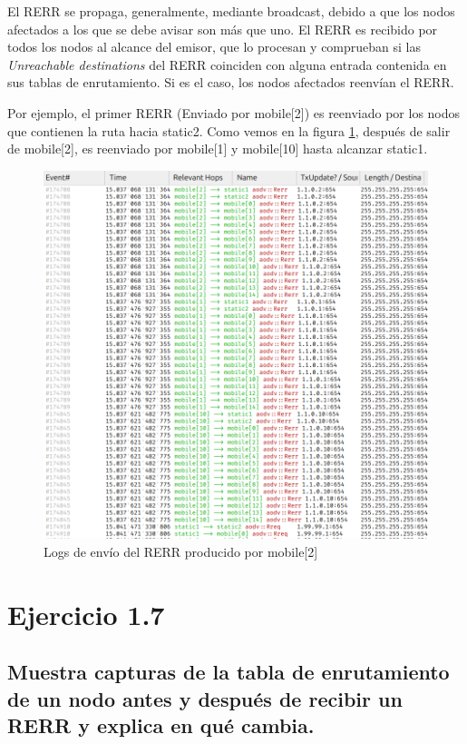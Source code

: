 El RERR se propaga, generalmente, mediante broadcast, debido a que los nodos afectados a los que se debe avisar son más que uno. El RERR es recibido por todos los nodos al alcance del emisor, que lo procesan y comprueban si las \textit{Unreachable destinations} del RERR coinciden con alguna entrada contenida en sus tablas de enrutamiento. Si es el caso, los nodos afectados reenvían el RERR.

Por ejemplo, el primer RERR (Enviado por mobile[2]) es reenviado por los nodos que contienen la ruta hacia static2. Como vemos en la figura \ref{fig:RerrPropagation}, después de salir de mobile[2], es reenviado por mobile[1] y mobile[10] hasta alcanzar static1.

\begin{figure}[H]
    \centering
    \includegraphics[width=125mm, scale=0.75]{imaxes/aodv/ejercicio6_1.png}
    \caption{Logs de envío del RERR producido por mobile[2]}
    \label{fig:RerrPropagation}
\end{figure}

\vspace{1.25cm}
\section{Ejercicio 1.7} 

\subsection{Muestra capturas de la tabla de enrutamiento de un nodo antes y después de recibir un RERR y explica en
qué cambia.}

